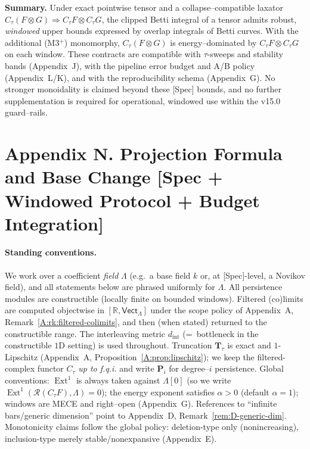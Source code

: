 \documentclass[11pt]{article}
\DeclareMathOperator{\Ext}{Ext}
\DeclareRobustCommand{\hyp}{\nobreakdash-}
\numberwithin{equation}{section}
\theoremstyle{definition}
\begin{document}
\medskip
\noindent\textbf{Summary.}
Under exact pointwise tensor and a collapse–compatible laxator \(C_\tau(F\otimes G)\Rightarrow C_\tau F\otimes C_\tau G\), the clipped Betti integral of a tensor admits robust, \emph{windowed} upper bounds expressed by overlap integrals of Betti curves. With the additional (M3$^{+}$) monomorphy, \(C_\tau(F\otimes G)\) is energy–dominated by \(C_\tau F\otimes C_\tau G\) on each window. These contracts are compatible with \(\tau\)\hyp sweeps and stability bands (Appendix~J), with the pipeline error budget and A/B policy (Appendix~L/K), and with the reproducibility schema (Appendix~G). No stronger monoidality is claimed beyond these [Spec] bounds, and no further supplementation is required for operational, windowed use within the v15.0 guard–rails.



\section*{Appendix N. Projection Formula and Base Change [Spec + Windowed Protocol + Budget Integration]}
{}
\label{N:pf-bc}

\paragraph{Standing conventions.}
We work over a coefficient \emph{field} \(\Lambda\) (e.g.\ a base field \(k\) or, at [Spec]-level, a Novikov field), and all statements below are phrased uniformly for \(\Lambda\).
All persistence modules are constructible (locally finite on bounded windows).
Filtered (co)limits are computed objectwise in \([\mathbb{R},\mathsf{Vect}_\Lambda]\) under the scope policy of Appendix~A, Remark~\ref{A:rk:filtered-colimits}, and then (when stated) returned to the constructible range.
The interleaving metric \(d_{\mathrm{int}}\) (=\ bottleneck in the constructible \(1\)D setting) is used throughout.
Truncation \(\mathbf{T}_\tau\) is exact and \(1\)\hyp Lipschitz (Appendix~A, Proposition~\ref{A:prop:lipschitz}); we keep the filtered-complex functor \(C_\tau\) \emph{up to f.q.i.} and write \(\mathbf{P}_i\) for degree–\(i\) persistence.
Global conventions: \(\Ext^1\) is always taken against \(\Lambda[0]\) (so we write \(\Ext^1(\mathcal{R}(C_\tau F),\Lambda)=0\)); the energy exponent satisfies \(\alpha>0\) (default \(\alpha=1\)); windows are MECE and right–open (Appendix~G).
References to “infinite bars/generic dimension” point to Appendix~D, Remark~\ref{rem:D-generic-dim}.
Monotonicity claims follow the global policy: deletion-type only (nonincreasing), inclusion-type merely stable/nonexpansive (Appendix~E).
\end{document}

